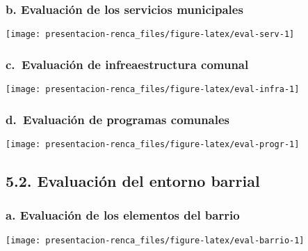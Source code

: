 \documentclass[
]{article}
\begin{document}
\hypertarget{b.-evaluaciuxf3n-de-los-servicios-municipales}{%
\subsubsection{b. Evaluación de los servicios
municipales}\label{b.-evaluaciuxf3n-de-los-servicios-municipales}}

\begin{flushleft}\texttt{[image: presentacion-renca\_files/figure-latex/eval-serv-1]} \end{flushleft}

\hypertarget{c.-evaluaciuxf3n-de-infreaestructura-comunal}{%
\subsubsection{c.~Evaluación de infreaestructura
comunal}\label{c.-evaluaciuxf3n-de-infreaestructura-comunal}}

\begin{flushleft}\texttt{[image: presentacion-renca\_files/figure-latex/eval-infra-1]} \end{flushleft}

\hypertarget{d.-evaluaciuxf3n-de-programas-comunales}{%
\subsubsection{d.~Evaluación de programas
comunales}\label{d.-evaluaciuxf3n-de-programas-comunales}}

\begin{flushleft}\texttt{[image: presentacion-renca\_files/figure-latex/eval-progr-1]} \end{flushleft}

\hypertarget{evaluaciuxf3n-del-entorno-barrial}{%
\subsection{5.2. Evaluación del entorno
barrial}\label{evaluaciuxf3n-del-entorno-barrial}}

\hypertarget{a.-evaluaciuxf3n-de-los-elementos-del-barrio}{%
\subsubsection{a. Evaluación de los elementos del
barrio}\label{a.-evaluaciuxf3n-de-los-elementos-del-barrio}}

\begin{flushleft}\texttt{[image: presentacion-renca\_files/figure-latex/eval-barrio-1]} \end{flushleft}
\end{document}
